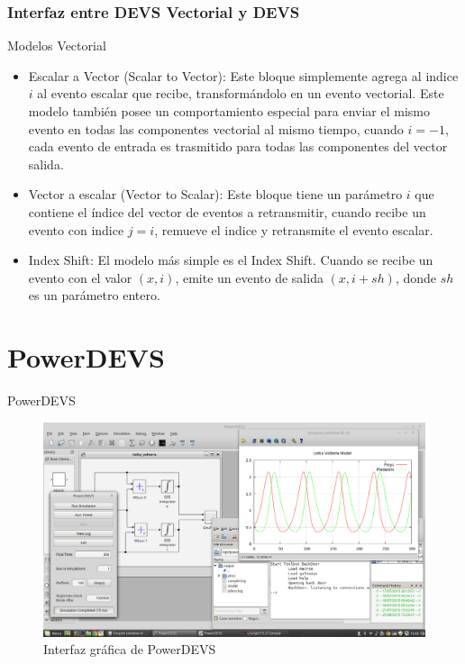 \documentclass{beamer}
\begin{document}
\subsubsection{Interfaz entre DEVS Vectorial y DEVS}
\begin{frame}{Modelos Vectorial}
	\begin{itemize}
		\item<1-> Escalar a Vector (Scalar to Vector): Este bloque simplemente agrega al indice $i$ al evento escalar que recibe, transformándolo en un 
			evento vectorial. Este modelo también posee un comportamiento especial para enviar el mismo evento en todas las componentes vectorial 
			al mismo tiempo, cuando $i = -1$, cada evento de entrada es trasmitido para todas las componentes del vector salida.
		\item<2-> Vector a escalar (Vector to Scalar): Este bloque tiene un parámetro $i$ que contiene el índice del vector de eventos a retransmitir, 
			cuando recibe un evento con indice $j=i$, remueve el indice y retransmite el evento escalar.
		\item<3-> Index Shift: El modelo más simple es el Index Shift. Cuando se recibe un evento con el valor $(x,i)$, emite un evento de salida $(x, i+sh)$, 
			donde $sh$ es un parámetro entero.
	\end{itemize}
\end{frame}

\section{PowerDEVS}
\begin{frame}{PowerDEVS}
	\begin{figure}[H]
	  \includegraphics[width=\textwidth]{powerdevs}
	  \caption{Interfaz gráfica de PowerDEVS}
	   \label{fig:powerdevsgui}
	\end{figure}
\end{frame}
\end{document}
